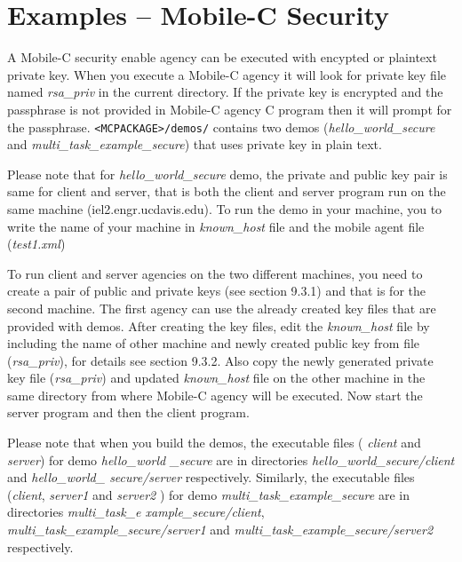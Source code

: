 \documentclass[11pt]{report}
\begin{document}

\section{Examples -- Mobile-C Security}
A Mobile-C security enable agency can be executed with encypted or plaintext
  private key. 
When you execute a Mobile-C agency it will look for private key file named
  \textit{rsa\_priv} in the current directory. 
If the private key is encrypted and the passphrase is not provided in Mobile-C
  agency C program then it will prompt for the passphrase.
\texttt{<MCPACKAGE>/demos/} contains two demos 
  (\textit{hello\_world\_secure} and \textit{multi\_task\_example\_secure}) that 
  uses private key in plain text.

Please note that for \textit{hello\_world\_secure} demo, the private and public
  key pair is same for client and server, that is both the client and server 
  program run on the same machine (iel2.engr.ucdavis.edu).
To run the demo in your machine, you to write the name of your machine in 
  \textit{known\_host} file and the mobile agent file (\textit{test1.xml}) 

To run client and server agencies on the two different machines, you need to
  create a pair of public and private keys (see section 9.3.1) and that 
  is for the second machine.  
The first agency can use the already created key files that are provided with
  demos.
After creating the key files, edit the \textit{known\_host} file by including
  the name of other machine and newly created public key from file 
  (\textit{rsa\_priv}), for details see section 9.3.2.
Also copy the newly generated private key file (\textit{rsa\_priv}) and 
  updated \textit{known\_host} file on the other machine in the same 
  directory from where Mobile-C agency will be executed.
Now start the server program and then the client program.

Please note that when you build the demos, the executable 
 files ( \textit{client} and  \textit{server}) for demo 
 \textit{hello\_world \_secure} are in 
 directories \textit{hello\_world\_secure/client} and 
 \textit{hello\_world\_ secure/server} respectively. Similarly, the executable 
 files (\textit{client},  \textit{server1} and  \textit{server2} ) for demo
  \textit{multi\_task\_example\_secure} are in directories 
   \textit{multi\_task\_e xample\_secure/client}, 
   \textit{multi\_task\_example\_secure/server1} and
   \textit{multi\_task\_example\_secure/server2} respectively.
\end{document}
